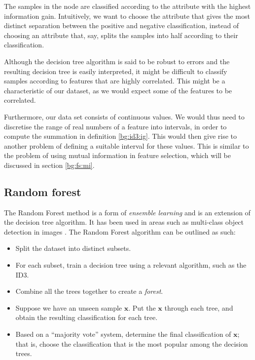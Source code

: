 \documentclass[12pt, twoside, a4paper]{report}
\begin{document}
The samples in the node are classified according to the attribute with the highest information gain. Intuitively, we want to choose the attribute that gives the most distinct separation between the positive and negative classification, instead of choosing an attribute that, say, splits the samples into half according to their classification.

Although the decision tree algorithm is said to be robust to errors \cite{RefWorks:98} and the resulting decision tree is easily interpreted, it might be difficult to classify samples according to features that are highly correlated. This might be a characteristic of our dataset, as we would expect some of the features to be correlated.

Furthermore, our data set consists of continuous values. We would thus need to discretise the range of real numbers of a feature into intervals, in order to compute the summation in definition \ref{bg:id3:ig}. This would then give rise to another problem of defining a suitable interval for these values. This is similar to the problem of using mutual information in feature selection, which will be discussed in section \ref{bg:fs:mi}.

\subsection{Random forest}
The Random Forest method \cite{RefWorks:101} is a form of \textit{ensemble learning} and is an extension of the decision tree algorithm. It has been used in areas such as multi-class object detection in images \cite{RefWorks:100}. The Random Forest algorithm can be outlined as such:
\begin{itemize}
\item Split the dataset into distinct subsets.
\item For each subset, train a decision tree using a relevant algorithm, such as the ID3.
\item Combine all the trees together to create a \textit{forest}.
\item Suppose we have an unseen sample $\boldsymbol x$.  Put the $\boldsymbol x$ through each tree, and obtain the resulting classification for each tree.
\item Based on a ``majority vote'' system, determine the final classification of $\boldsymbol x$; that is, choose the classification that is the most popular among the decision trees.
\end{itemize}
\end{document}
